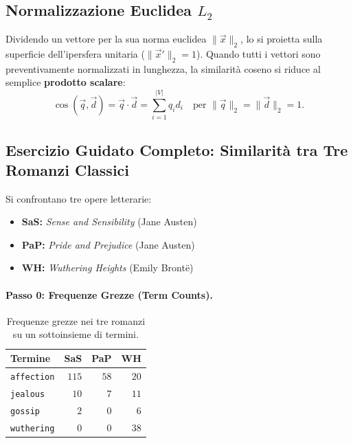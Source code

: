 \subsection[Normalizzazione Euclidea L2]{Normalizzazione Euclidea \texorpdfstring{$L_2$}{L2}}
Dividendo un vettore per la sua norma euclidea $\|\vec{x}\|_2$, lo si proietta sulla superficie dell'ipersfera unitaria ($\|\vec{x}'\|_2 = 1$). Quando tutti i vettori sono preventivamente normalizzati in lunghezza, la similarit\`a coseno si riduce al semplice \textbf{prodotto scalare}:
\begin{equation}
\cos(\vec{q}, \vec{d}) = \vec{q} \cdot \vec{d} = \sum_{i=1}^{|V|} q_i d_i \quad \text{per } \|\vec{q}\|_2 = \|\vec{d}\|_2 = 1.
\end{equation}

\subsection{Esercizio Guidato Completo: Similarit\`a tra Tre Romanzi Classici}

Si confrontano tre opere letterarie:
\begin{itemize}
    \item \textbf{SaS:} \textit{Sense and Sensibility} (Jane Austen)
    \item \textbf{PaP:} \textit{Pride and Prejudice} (Jane Austen)
    \item \textbf{WH:} \textit{Wuthering Heights} (Emily Bront\"e)
\end{itemize}

\paragraph{Passo 0: Frequenze Grezze (Term Counts).}
\begin{table}[H]
\centering
\small
\begin{tabular}{l r r r}
\toprule
\textbf{Termine} & \textbf{SaS} & \textbf{PaP} & \textbf{WH} \\
\midrule
\texttt{affection} & $115$ & $58$ & $20$ \\
\texttt{jealous}   & $10$  & $7$  & $11$ \\
\texttt{gossip}    & $2$   & $0$  & $6$  \\
\texttt{wuthering} & $0$   & $0$  & $38$ \\
\bottomrule
\end{tabular}
\caption{Frequenze grezze nei tre romanzi su un sottoinsieme di termini.}
\label{tab:novels-raw}
\end{table}

